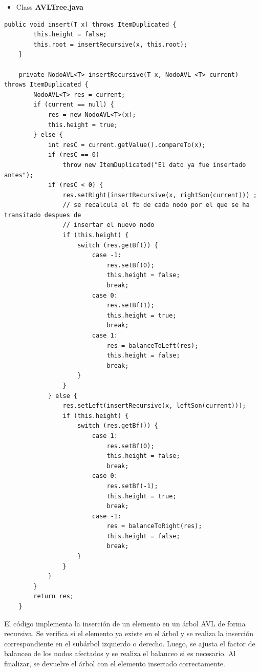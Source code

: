 \documentclass{article}
\begin{document}
\begin{itemize}
        \item Class \textbf{AVLTree.java}
    \end{itemize}
    \begin{lstlisting}[caption={\textbf{Metodo para insertar}}]
        public void insert(T x) throws ItemDuplicated {
		this.height = false;
		this.root = insertRecursive(x, this.root);
	}

	private NodoAVL<T> insertRecursive(T x, NodoAVL <T> current) throws ItemDuplicated {
		NodoAVL<T> res = current;
		if (current == null) {
			res = new NodoAVL<T>(x);
			this.height = true;
		} else {
			int resC = current.getValue().compareTo(x);
			if (resC == 0)
				throw new ItemDuplicated("El dato ya fue insertado antes");
			if (resC < 0) {
				res.setRight(insertRecursive(x, rightSon(current))) ;
				// se recalcula el fb de cada nodo por el que se ha transitado despues de
				// insertar el nuevo nodo
				if (this.height) {
					switch (res.getBf()) {
						case -1:
							res.setBf(0);
							this.height = false;
							break;
						case 0:
							res.setBf(1);
							this.height = true;
							break;
						case 1:
							res = balanceToLeft(res);
							this.height = false;
							break;
					}
				}
			} else {
				res.setLeft(insertRecursive(x, leftSon(current)));
				if (this.height) {
					switch (res.getBf()) {
						case 1:
							res.setBf(0);
							this.height = false;
							break;
						case 0:
							res.setBf(-1);
							this.height = true;
							break;
						case -1:
							res = balanceToRight(res);
							this.height = false;
							break;
					}
				}
			}
		}
		return res;
	}
         \end{lstlisting}
El código implementa la inserción de un elemento en un árbol AVL de forma recursiva. Se verifica si el elemento ya existe en el árbol y se realiza la inserción correspondiente en el subárbol izquierdo o derecho. Luego, se ajusta el factor de balanceo de los nodos afectados y se realiza el balanceo si es necesario. Al finalizar, se devuelve el árbol con el elemento insertado correctamente.
\end{document}
